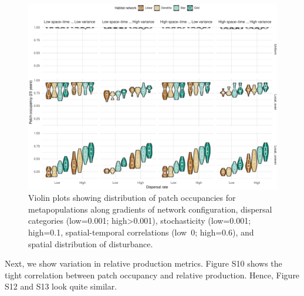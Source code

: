 \documentclass[
]{article}
\begin{document}
\begin{figure}[H]

{\centering \includegraphics{Managing_for_ecological_surprises_in_metapopulations_files/figure-latex/violin plots of risk of patch occupancy-1} 

}

\caption{Violin plots showing distribution of patch occupancies for metapopulations along gradients of network configuration, dispersal categories (low=0.001; high>0.001), stochasticity (low=0.001; high=0.1, spatial-temporal correlations (low~0; high=0.6), and spatial distribution of disturbance.}\label{fig:violin plots of risk of patch occupancy}
\end{figure}

Next, we show variation in relative production metrics. Figure S10 shows
the tight correlation between patch occupancy and relative production.
Hence, Figure S12 and S13 look quite similar.
\end{document}
